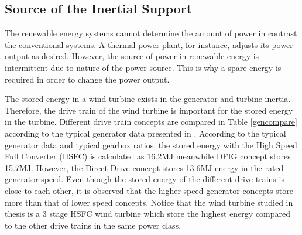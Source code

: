 \subsection{Source of the Inertial Support}
The renewable energy systems cannot determine the amount of power in contrast the conventional systems. A thermal power plant, for instance, adjusts its power output as desired. However, the source of power in renewable energy is intermittent due to nature of the power source. This is why a spare energy is required in order to change the power output.\par
The stored energy in a wind turbine exists in the generator and turbine inertia. Therefore, the drive train of the wind turbine is important for the stored energy in the turbine. Different drive train concepts are compared in Table \ref{gencompare} according to the typical generator data presented in \cite{Seman2011}. According to the typical generator data and typical gearbox ratios, the stored energy with the High Speed Full Converter (HSFC) is calculated as 16.2MJ meanwhile DFIG concept stores 15.7MJ. However, the Direct-Drive concept stores 13.6MJ energy in the rated generator speed. Even though the stored energy of the different drive trains is close to each other, it is observed that the higher speed generator concepts store more than that of lower speed concepts. Notice that the wind turbine studied in thesis is a 3 stage HSFC wind turbine which store the highest energy compared to the other drive trains in the same power class.
